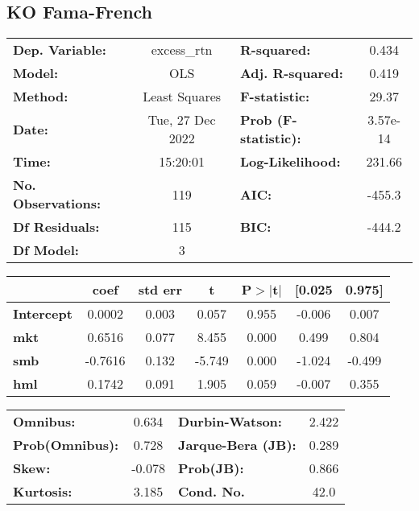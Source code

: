 \documentclass{report}
\begin{document}
\subsection{KO Fama-French}

\begin{center}
\begin{tabular}{lclc}
\toprule
\textbf{Dep. Variable:}    &   excess\_rtn    & \textbf{  R-squared:         } &     0.434   \\
\textbf{Model:}            &       OLS        & \textbf{  Adj. R-squared:    } &     0.419   \\
\textbf{Method:}           &  Least Squares   & \textbf{  F-statistic:       } &     29.37   \\
\textbf{Date:}             & Tue, 27 Dec 2022 & \textbf{  Prob (F-statistic):} &  3.57e-14   \\
\textbf{Time:}             &     15:20:01     & \textbf{  Log-Likelihood:    } &    231.66   \\
\textbf{No. Observations:} &         119      & \textbf{  AIC:               } &    -455.3   \\
\textbf{Df Residuals:}     &         115      & \textbf{  BIC:               } &    -444.2   \\
\textbf{Df Model:}         &           3      & \textbf{                     } &             \\
\bottomrule
\end{tabular}
\begin{tabular}{lcccccc}
                   & \textbf{coef} & \textbf{std err} & \textbf{t} & \textbf{P$> |$t$|$} & \textbf{[0.025} & \textbf{0.975]}  \\
\midrule
\textbf{Intercept} &       0.0002  &        0.003     &     0.057  &         0.955        &       -0.006    &        0.007     \\
\textbf{mkt}       &       0.6516  &        0.077     &     8.455  &         0.000        &        0.499    &        0.804     \\
\textbf{smb}       &      -0.7616  &        0.132     &    -5.749  &         0.000        &       -1.024    &       -0.499     \\
\textbf{hml}       &       0.1742  &        0.091     &     1.905  &         0.059        &       -0.007    &        0.355     \\
\bottomrule
\end{tabular}
\begin{tabular}{lclc}
\textbf{Omnibus:}       &  0.634 & \textbf{  Durbin-Watson:     } &    2.422  \\
\textbf{Prob(Omnibus):} &  0.728 & \textbf{  Jarque-Bera (JB):  } &    0.289  \\
\textbf{Skew:}          & -0.078 & \textbf{  Prob(JB):          } &    0.866  \\
\textbf{Kurtosis:}      &  3.185 & \textbf{  Cond. No.          } &     42.0  \\
\bottomrule
\end{tabular}
\end{center}
\end{document}
